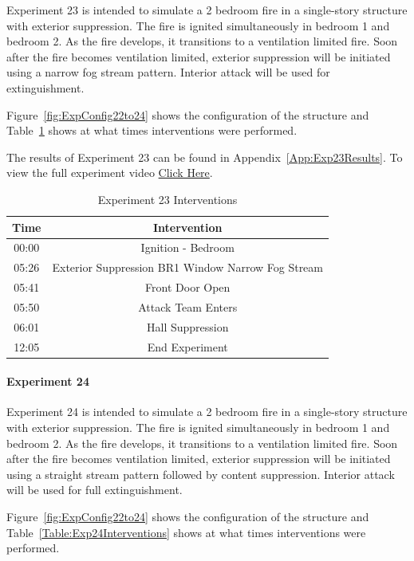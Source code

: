 \documentclass[12pt,oneside]{book}
\begin{document}
Experiment 23 is intended to simulate a 2 bedroom fire in a single-story structure with exterior suppression. The fire is ignited simultaneously in bedroom 1 and bedroom 2. As the fire develops, it transitions to a ventilation limited fire. Soon after the fire becomes ventilation limited, exterior suppression will be initiated using a narrow fog stream pattern. Interior attack will be used for extinguishment. 

Figure~\ref{fig:ExpConfig22to24} shows the configuration of the structure and Table~\ref{Table:Exp23Interventions} shows at what times interventions were performed. 

The results of Experiment 23 can be found in Appendix~\ref{App:Exp23Results}. To view the full experiment video \href{https://youtu.be/gl8rc1Nsl1k}{Click Here}.

\begin{table}[H]
	\centering
	\caption{Experiment 23 Interventions}
	\begin{tabular}{|c|c|} 
		\hline
		Time & Intervention \\ \hline \hline
		00:00 & Ignition - Bedroom \\ \hline
		05:26 & Exterior Suppression BR1 Window Narrow Fog Stream \\ \hline
		05:41 & Front Door Open \\ \hline
		05:50 & Attack Team Enters\\ \hline
		06:01 & Hall Suppression \\ \hline 
		12:05 & End Experiment\\ \hline
	\end{tabular}
	\label{Table:Exp23Interventions}
\end{table}

\clearpage

\paragraph{Experiment 24} \mbox{}

Experiment 24 is intended to simulate a 2 bedroom fire in a single-story structure with exterior suppression. The fire is ignited simultaneously in bedroom 1 and bedroom 2. As the fire develops, it transitions to a ventilation limited fire. Soon after the fire becomes ventilation limited, exterior suppression will be initiated using a straight stream pattern followed by content suppression. Interior attack will be used for full extinguishment.

Figure~\ref{fig:ExpConfig22to24} shows the configuration of the structure and Table~\ref{Table:Exp24Interventions} shows at what times interventions were performed. 
\end{document}
